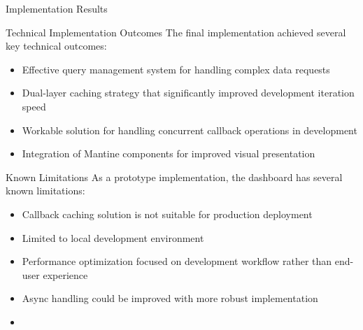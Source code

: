 \begin{section}{Implementation Results}
	\begin{subsection}{Technical Implementation Outcomes}
		\label{subsec:implementation-results-technical}
		The final implementation achieved several key technical outcomes:

		\begin{itemize}
			\item Effective query management system for handling complex data requests
			\item Dual-layer caching strategy that significantly improved development iteration speed
			\item Workable solution for handling concurrent callback operations in development
			\item Integration of Mantine components for improved visual presentation
		\end{itemize}
	\end{subsection}

	\begin{subsection}{Known Limitations}
		\label{subsec:implementation-results-limitations}
		As a prototype implementation, the dashboard has several known limitations:

		\begin{itemize}
			\item Callback caching solution is not suitable for production deployment
			\item Limited to local development environment
			\item Performance optimization focused on development workflow rather than end-user experience
			\item Async handling could be improved with more robust implementation
			\item {}
		\end{itemize}
	\end{subsection}
\end{section}

